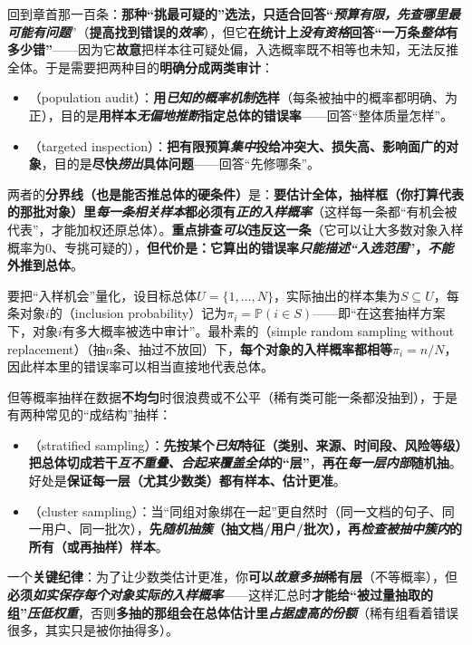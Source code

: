回到章首那一百条：\textbf{那种“挑最可疑的”选法，只适合回答“\emph{预算有限，先查哪里最可能有问题}}”（\textbf{提高找到错误的\emph{效率}}），但它\textbf{在统计上\emph{没有资格}回答“一万条\emph{整体}有多少错”}——因为它\textbf{故意}把样本往可疑处偏，入选概率既不相等也未知，无法反推全体。于是需要把两种目的\textbf{明确分成两类审计}：
\begin{itemize}\item {}（population audit）：\textbf{用\emph{已知的概率机制}选样}（每条被抽中的概率都明确、为正），目的是\textbf{用样本\emph{无偏地推断}指定总体的错误率}——回答“整体质量怎样”。\item {}（targeted inspection）：\textbf{把有限预算\emph{集中}投给冲突大、损失高、影响面广的对象}，目的是\textbf{尽快\emph{捞出}具体问题}——回答“先修哪条”。\end{itemize}
两者的\textbf{分界线（也是能否推总体的硬条件）}是：\textbf{要估计全体，抽样框（你打算代表的那批对象）里\emph{每一条相关样本}都必须有\emph{正的入样概率}}（这样每一条都“有机会被代表”，才能加权还原总体）。\textbf{重点排查\emph{可以}违反这一条}（它可以让大多数对象入样概率为0、专挑可疑的），\textbf{但代价是：它算出的错误率\emph{只能描述“入选范围}”，\emph{不能}外推到总体}。

要把“入样机会”量化，设目标总体$U=\{1,\ldots,N\}$，实际抽出的样本集为$S\subseteq U$，每条对象$i$的（inclusion probability）记为$\pi_i=\mathbb{P}(i\in S)$——即“在这套抽样方案下，对象$i$有多大概率被选中审计”。最朴素的（simple random sampling without replacement）（抽$n$条、抽过不放回）下，\textbf{每个对象的入样概率都相等}$\pi_i=n/N$，因此样本里的错误率可以相当直接地代表总体。

但等概率抽样在数据\textbf{不均匀}时很浪费或不公平（稀有类可能一条都没抽到），于是有两种常见的“成结构”抽样：
\begin{itemize}\item {}（stratified sampling）：\textbf{先按某个\emph{已知}特征（类别、来源、时间段、风险等级）把总体切成若干\emph{互不重叠、合起来覆盖全体}的“层”}，\textbf{再在\emph{每一层内部}随机抽}。好处是\textbf{保证每一层（尤其少数类）都有样本、估计更准}。\item {}（cluster sampling）：当“同组对象绑在一起”更自然时（同一文档的句子、同一用户、同一批次），\textbf{先\emph{随机抽簇}（抽文档/用户/批次），再\emph{检查被抽中簇内}的所有（或再抽样）样本}。\end{itemize}
一个\textbf{关键纪律}：为了让少数类估计更准，你\textbf{可以\emph{故意多抽}稀有层}（不等概率），但\textbf{必须\emph{如实保存每个对象实际的入样概率}}——这样汇总时\textbf{才能给“被过量抽取的组”\emph{压低权重}}，否则\textbf{多抽的那组会在总体估计里\emph{占据虚高的份额}}（稀有组看着错误很多，其实只是被你抽得多）。

